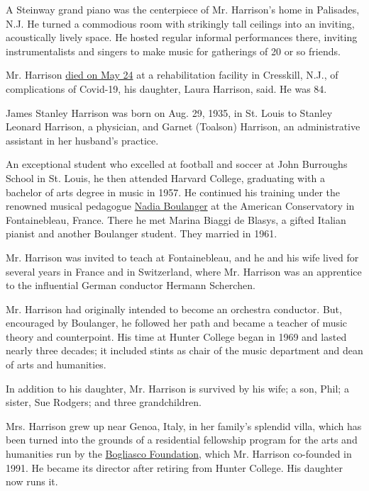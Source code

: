 A Steinway grand piano was the centerpiece of Mr. Harrison's home in
Palisades, N.J. He turned a commodious room with strikingly tall
ceilings into an inviting, acoustically lively space. He hosted regular
informal performances there, inviting instrumentalists and singers to
make music for gatherings of 20 or so friends.

Mr. Harrison
\href{https://www.legacy.com/obituaries/nytimes/obituary.aspx?n=james-harrison\&pid=196277434\&fhid=17032}{died
on May 24} at a rehabilitation facility in Cresskill, N.J., of
complications of Covid-19, his daughter, Laura Harrison, said. He was
84.

James Stanley Harrison was born on Aug. 29, 1935, in St. Louis to
Stanley Leonard Harrison, a physician, and Garnet (Toalson) Harrison, an
administrative assistant in her husband's practice.

An exceptional student who excelled at football and soccer at John
Burroughs School in St. Louis, he then attended Harvard College,
graduating with a bachelor of arts degree in music in 1957. He continued
his training under the renowned musical pedagogue
\href{https://www.nytimes.com/1979/10/23/archives/nadia-boulanger-teacher-of-top-composers-dies-onewoman-graduate.html\#:~:text=Nadia\%20Boulanger\%2C\%20the\%20French\%20teacher,in\%20coma\%20for\%20three\%20weeks.}{Nadia
Boulanger} at the American Conservatory in Fontainebleau, France. There
he met Marina Biaggi de Blasys, a gifted Italian pianist and another
Boulanger student. They married in 1961.

Mr. Harrison was invited to teach at Fontainebleau, and he and his wife
lived for several years in France and in Switzerland, where Mr. Harrison
was an apprentice to the influential German conductor Hermann Scherchen.

Mr. Harrison had originally intended to become an orchestra conductor.
But, encouraged by Boulanger, he followed her path and became a teacher
of music theory and counterpoint. His time at Hunter College began in
1969 and lasted nearly three decades; it included stints as chair of the
music department and dean of arts and humanities.

In addition to his daughter, Mr. Harrison is survived by his wife; a
son, Phil; a sister, Sue Rodgers; and three grandchildren.

Mrs. Harrison grew up near Genoa, Italy, in her family's splendid villa,
which has been turned into the grounds of a residential fellowship
program for the arts and humanities run by the
\href{https://www.bfny.org/}{Bogliasco Foundation}, which Mr. Harrison
co-founded in 1991. He became its director after retiring from Hunter
College. His daughter now runs it.

